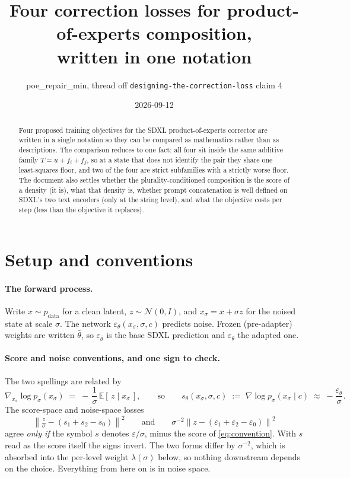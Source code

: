 \documentclass[11pt]{article}
\title{Four correction losses for product-of-experts composition,\\ written in one notation}
\author{poe\_repair\_min, thread off \texttt{designing-the-correction-loss} claim 4}
\date{2026-09-12}
\newcommand{\eps}{\varepsilon}
\newcommand{\epsth}{\eps_\theta}
\newcommand{\epsfr}{\eps_{\bar\theta}}
\newcommand{\xs}{x_\sigma}
\newcommand{\E}{\mathbb{E}}
\newcommand{\norm}[1]{\left\lVert #1 \right\rVert}
\theoremstyle{plain}
\theoremstyle{remark}
\begin{document}
\maketitle

\begin{abstract}
Four proposed training objectives for the SDXL product-of-experts corrector are written in a
single notation so they can be compared as mathematics rather than as descriptions. The
comparison reduces to one fact: all four sit inside the same additive family
$T = u + f_i + f_j$, so at a state that does not identify the pair they share one least-squares
floor, and two of the four are strict subfamilies with a strictly worse floor. The document
also settles whether the plurality-conditioned composition is the score of a density (it is),
what that density is, whether prompt concatenation is well defined on SDXL's two text encoders
(only at the string level), and what the objective costs per step (less than the objective it
replaces).
\end{abstract}

\tableofcontents

\section{Setup and conventions}

\paragraph{The forward process.}
Write $x \sim p_{\mathrm{data}}$ for a clean latent, $z \sim \mathcal{N}(0,I)$, and
$\xs = x + \sigma z$ for the noised state at scale $\sigma$. The network
$\epsth(\xs,\sigma,c)$ predicts noise. Frozen (pre-adapter) weights are written $\bar\theta$,
so $\epsfr$ is the base SDXL prediction and $\epsth$ the adapted one.

\paragraph{Score and noise conventions, and one sign to check.}
The two spellings are related by
\begin{equation}
  \nabla_{\xs} \log p_\sigma(\xs) \;=\; -\,\frac{1}{\sigma}\,\E[\,z \mid \xs\,],
  \qquad\text{so}\qquad
  s_\theta(\xs,\sigma,c) \;:=\; \nabla \log p_\sigma(\xs \mid c) \;\approx\; -\frac{\epsth}{\sigma}.
  \label{eq:convention}
\end{equation}
The score-space and noise-space losses
\begin{equation*}
  \norm{\tfrac{z}{\sigma} - (s_1 + s_2 - s_0)}^2
  \qquad\text{and}\qquad
  \sigma^{-2}\norm{z - (\eps_1 + \eps_2 - \eps_0)}^2
\end{equation*}
agree \emph{only if} the symbol $s$ denotes $\eps/\sigma$, minus the score of
\eqref{eq:convention}. With
$s$ read as the score itself the signs invert. The two forms differ by $\sigma^{-2}$, which is
absorbed into the per-level weight $\lambda(\sigma)$ below, so nothing downstream depends on
the choice. Everything from here on is in noise space.
\end{document}
